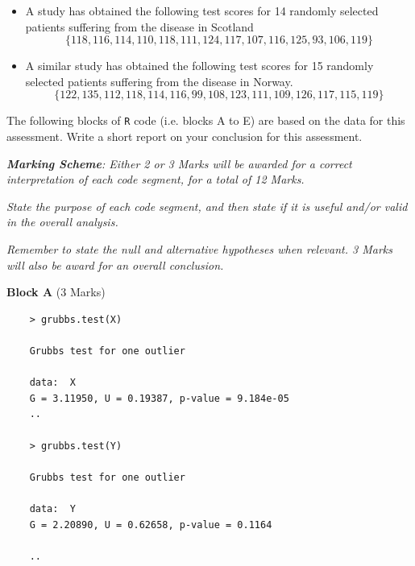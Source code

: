 \documentclass[a4paper,12pt]{article}
\begin{document}
\begin{itemize}
	\item A study has obtained the following test scores for 14 randomly selected patients suffering from the disease in Scotland 
	\[ \{118, 116, 114, 110, 118, 111, 124, 117, 107, 116, 125, 93, 
	106, 119\}\]
	
	\item A similar study has obtained the following test scores for 15 randomly selected patients suffering from the disease in Norway.
	\[\{122, 135, 112, 118, 114, 116, 99, 108, 123, 111, 109, 126, 117, 115, 119\}\]
	
\end{itemize}


% 

\noindent The following blocks of \texttt{R} code (i.e. blocks A to E) are based on the data for this assessment. Write a short report on your conclusion for this assessment. \\ \bigskip

\noindent \textit{\textbf{Marking Scheme}: Either 2 or 3 Marks will be awarded for a correct interpretation of each code segment, for a total of 12 Marks. }

\noindent \textit{State the purpose of each code segment, and then state if it is useful and/or valid in the overall analysis. }

\noindent \textit{Remember to state the null and alternative hypotheses when relevant. 3 Marks will also be award for an overall conclusion. }

\begin{framed}
	\noindent \textbf{Block A} (3 Marks) 
	
	
	\begin{verbatim}
	> grubbs.test(X)
	
	Grubbs test for one outlier
	
	data:  X
	G = 3.11950, U = 0.19387, p-value = 9.184e-05
	..
	
	> grubbs.test(Y)
	
	Grubbs test for one outlier
	
	data:  Y
	G = 2.20890, U = 0.62658, p-value = 0.1164
	
	..
	\end{verbatim}
\end{framed}
\end{document}
